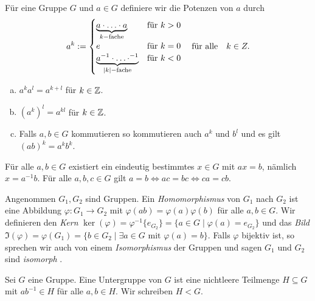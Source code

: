 \begin{definition}
	Für eine Gruppe $G$ und $a \in G$ definiere wir die Potenzen von $a$ durch
	\[
	a^{k} := \begin{cases}
		\underbrace{a \cdot \ldots \cdot a}_{k-\text{fache}} &\text{für } k > 0\\
		e &\text{für } k=0\\
		\underbrace{a^{-1} \cdot \ldots \cdot ^{-1}}_{\abs{k}-\text{fache}} &\text{für } k < 0
	\end{cases}
	\qq{für alle} k \in Z
	.\] 
\end{definition}

\begin{lemma}[Potenzregel]
	\begin{enumerate}[a)]
		\item $a^{k} a^{l} = a^{k+l}$ für $k \in \mathbb{Z}$.
		\item $(a^{k})^{l} = a^{k l}$ für  $k \in \mathbb{Z}$.
		\item Falls $a,b \in G$ kommutieren so kommutieren auch $a^{k}$ und $b^{l}$ und es gilt $(ab)^{k} = a^{k} b^{k}$.
	\end{enumerate}
\end{lemma}


\begin{lemma}
	Für alle $a,b \in G$ existiert ein eindeutig bestimmtes $x \in G$ mit $ax = b$, nämlich $x = a^{-1} b$.
	Für alle $a,b,c \in G$ gilt $a=b \Leftrightarrow ac = bc \Leftrightarrow ca = cb$.
\end{lemma}


\begin{definition}
	Angenommen $G_1, G_2$ sind Gruppen.
	Ein \emph{Homomorphismus} von $G_1$ nach $G_2$ ist eine Abbildung $\varphi: G_1 \to G_2$ mit
	$\varphi(ab) = \varphi(a) \varphi(b)$ für alle $a,b \in G$.
	Wir definieren den \emph{Kern} $\ker(\varphi) = \varphi^{-1} \{e_{G_2}\} = \{a \in G \mid \varphi(a) = e_{G_2}\} $
	und das \emph{Bild} $\Im(\varphi) = \varphi(G_1) = \{b \in G_2 \mid \exists a \in G \text{ mit } \varphi(a) = b\} $.
	Falls $\varphi$ bijektiv ist, so sprechen wir auch von einem \emph{Isomorphismus} der Gruppen
	und sagen $G_1$ und $G_2$ sind \emph{isomorph }.
\end{definition}

\begin{definition}
	Sei $G$ eine Gruppe. Eine Untergruppe von $G$ ist eine nichtleere Teilmenge $H \subseteq G$ mit $a b^{-1} \in H$ für alle $a,b \in H$. Wir schreiben $H < G$.
\end{definition}

